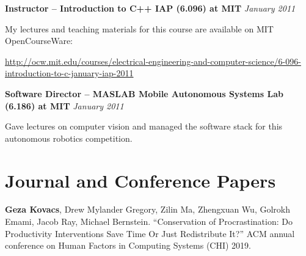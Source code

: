 \documentclass[margin,line]{resume}
\begin{document}
\begin{resume}
\vspace{-8mm}

\textbf{Instructor -- Introduction to C++ IAP (6.096) at MIT} \hfill \textsl{January 2011}\\

\vspace{-8mm}

My lectures and teaching materials for this course are available on MIT OpenCourseWare:\\

\vspace{-8mm}

\url{http://ocw.mit.edu/courses/electrical-engineering-and-computer-science/6-096-introduction-to-c-january-iap-2011} \\

\vspace{-7mm}

\textbf{Software Director -- MASLAB Mobile Autonomous Systems Lab (6.186) at MIT} \hfill \textsl{January 2011}\\

\vspace{-8mm}

Gave lectures on computer vision and managed the software stack for this autonomous robotics competition.

\section{\mysidestyle Journal and Conference Papers}


\textbf{Geza Kovacs}, Drew Mylander Gregory, Zilin Ma, Zhengxuan Wu, Golrokh Emami, Jacob Ray, Michael Bernstein. ``Conservation of Procrastination: Do Productivity Interventions Save Time Or Just Redistribute It?'' ACM annual conference on Human Factors in Computing Systems (CHI) 2019. %


\end{resume}
\end{document}
